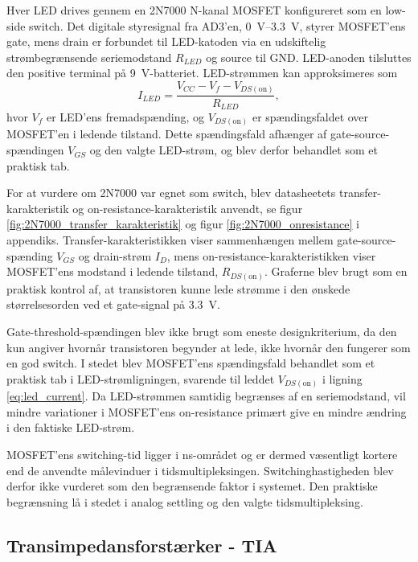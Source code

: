 Hver LED drives gennem en 2N7000 N-kanal MOSFET konfigureret som en low-side switch. Det digitale styresignal fra AD3'en, \SIrange{0}{3.3}{V}, styrer MOSFET'ens gate, mens drain er forbundet til LED-katoden via en udskiftelig strømbegrænsende seriemodstand $R_{LED}$ og source til GND. LED-anoden tilsluttes den positive terminal på \SI{9}{V}-batteriet. LED-strømmen kan approksimeres som
\begin{equation}
    I_{LED} = \frac{V_{CC} - V_f - V_{DS(\text{on})}}{R_{LED}},
    \label{eq:led_current}
\end{equation}
hvor $V_f$ er LED'ens fremadspænding, og $V_{DS(\text{on})}$ er spændingsfaldet over MOSFET'en i ledende tilstand. Dette spændingsfald afhænger af gate-source-spændingen $V_{GS}$ og den valgte LED-strøm, og blev derfor behandlet som et praktisk tab.

For at vurdere om 2N7000 var egnet som switch, blev datasheetets transfer-karakteristik og on-resistance-karakteristik anvendt, se figur \ref{fig:2N7000_transfer_karakteristik} og figur \ref{fig:2N7000_onresistance} i appendiks. Transfer-karakteristikken viser sammenhængen mellem gate-source-spænding $V_{GS}$ og drain-strøm $I_D$, mens on-resistance-karakteristikken viser MOSFET'ens modstand i ledende tilstand, $R_{DS(\text{on})}$. Graferne blev brugt som en praktisk kontrol af, at transistoren kunne lede strømme i den ønskede størrelsesorden ved et gate-signal på \SI{3.3}{V}.

Gate-threshold-spændingen blev ikke brugt som eneste designkriterium, da den kun angiver hvornår transistoren begynder at lede, ikke hvornår den fungerer som en god switch. I stedet blev MOSFET'ens spændingsfald behandlet som et praktisk tab i LED-strømligningen, svarende til leddet $V_{DS(\text{on})}$ i ligning \ref{eq:led_current}. Da LED-strømmen samtidig begrænses af en seriemodstand, vil mindre variationer i MOSFET'ens on-resistance primært give en mindre ændring i den faktiske LED-strøm.

MOSFET'ens switching-tid ligger i ns-området og er dermed væsentligt kortere end de anvendte målevinduer i tidsmultipleksingen. Switchinghastigheden blev derfor ikke vurderet som den begrænsende faktor i systemet. Den praktiske begrænsning lå i stedet i analog settling og den valgte tidsmultipleksing.


\subsection{Transimpedansforstærker - TIA}

